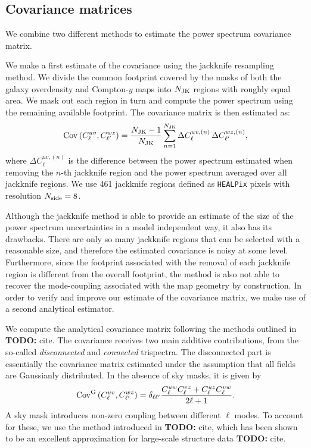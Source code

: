 \documentclass[useAMS,usenatbib]{mn2e}
\newcommand{\TODO}[1]{{\bf TODO:} #1}
\begin{document}
  \subsection{Covariance matrices}\label{ssec:methods.cov}
    We combine two different methods to estimate the power spectrum covariance matrix. 
    
    We make a first estimate of the covariance using the jackknife resampling method. We divide the common footprint covered by the masks of both the galaxy overdensity and Compton-$y$ maps into $N_{\rm JK}$ regions with roughly equal area. We mask out each region in turn and compute the power spectrum  using the remaining available footprint. The covariance matrix is then estimated as:
    \begin{equation}\label{eq:cov_jk}
      {\rm Cov}\left(C^{uv}_\ell,C^{wz}_{\ell'}\right)=\frac{N_{\rm JK}-1}{N_{\rm JK}}\sum_{n=1}^{N_{\rm JK}}\Delta C^{uv,(n)}_\ell\,\Delta C^{wz,(n)}_{\ell'},
    \end{equation}
    where $\Delta C^{uv,(n)}_\ell$ is the difference between the power spectrum estimated when removing the $n$-th jackknife region and the power spectrum averaged over all jackknife regions. We use 461 jackknife regions defined as {\tt HEALPix} pixels with resolution $N_{\rm side}=8$.

    Although the jackknife method is able to provide an estimate of the size of the power spectrum uncertainties in a model independent way, it also has its drawbacks. There are only so many jackknife regions that can be selected with a reasonable size, and therefore the estimated covariance is noisy at some level. Furthermore, since the footprint associated with the removal of each jackknife region is different from the overall footprint, the method is also not able to recover the mode-coupling associated with the map geometry by construction. In order to verify and improve our estimate of the covariance matrix, we make use of a second analytical estimator.

    We compute the analytical covariance matrix following the methods outlined in \TODO{cite}. The covariance receives two main additive contributions, from the so-called {\sl disconnected} and {\sl connected} trispectra. The disconnected part is essentially the covariance matrix estimated under the assumption that all fields are Gaussianly distributed. In the absence of sky masks, it is given by
    \begin{equation}
      {\rm Cov}^{\rm G}\left(C^{uv}_\ell,C^{wz}_{\ell'}\right)=\delta_{\ell\ell'}\frac{C^{uw}_\ell C^{vz}_\ell+C^{uz}_\ell C^{vw}_\ell}{2\ell+1}.
    \end{equation}
    A sky mask introduces non-zero coupling between different $\ell$ modes. To account for these, we use the  method introduced in \TODO{cite}, which has been shown to be an excellent approximation for large-scale structure data \TODO{cite}.
\end{document}
